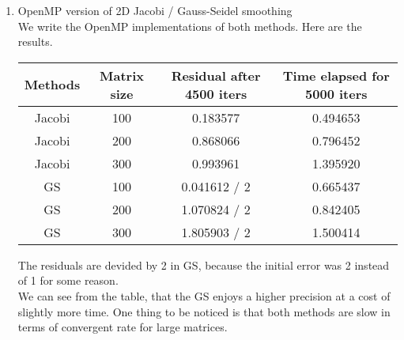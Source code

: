 \documentclass{article}
\begin{document}
\begin{enumerate}
\item OpenMP version of 2D Jacobi / Gauss-Seidel smoothing
\\
We write the OpenMP implementations of both methods. Here are the results.
\begin{center}
\begin{tabular}{|c|c|c|c|}
\hline
 Methods & Matrix size & Residual after 4500 iters &  Time elapsed for 5000 iters\\
\hline
Jacobi & 100 & 0.183577  & 0.494653\\ \hline
Jacobi & 200  & 0.868066& 0.796452\\ \hline
Jacobi & 300 & 0.993961 & 1.395920 \\ \hline
GS & 100 &0.041612 / 2&0.665437\\ \hline
GS & 200 & 1.070824 / 2&0.842405\\ \hline
GS& 300 & 1.805903 / 2& 1.500414 \\ \hline
\end{tabular}
\end{center}
The residuals are devided by 2 in GS, because the initial error was 2 instead of 1 for some reason.
\\
We can see from the table, that the GS enjoys a higher precision at a cost of slightly more time. One thing to be noticed is that both methods are slow in terms of convergent rate for large matrices.
\end{enumerate}
\end{document}
